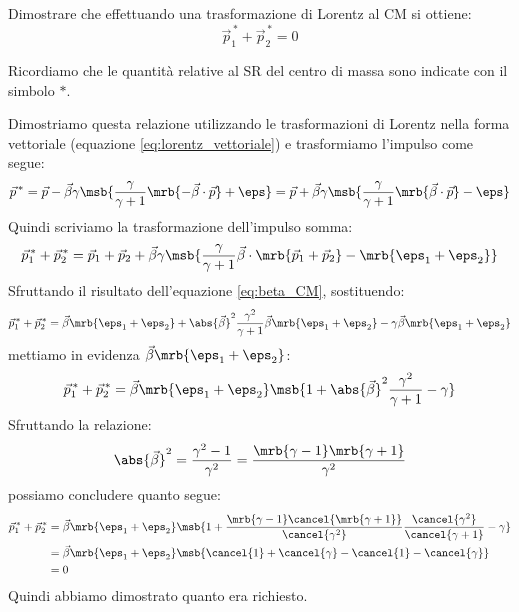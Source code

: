 \begin{example}[]
	Dimostrare che effettuando una trasformazione di Lorentz al CM si ottiene:
	\begin{equation}
		\vec{p}_1^{\,\ast} + \vec{p}_2^{\,\ast} = 0
	\end{equation}

	\begin{note}[]
		Ricordiamo che le quantità relative al SR del centro di massa sono indicate
		con il simbolo $\ast$.
	\end{note}

	Dimostriamo questa relazione utilizzando le trasformazioni di Lorentz nella
	forma vettoriale (equazione \ref{eq:lorentz_vettoriale}) e trasformiamo
	l'impulso come segue:
	\begin{equation}
		\vec{p}^{\,\ast} = \vec{p} - \vec{\beta}\gamma \msb{\frac{\gamma}{\gamma +
				1} \mrb{ -\vec{\beta} \cdot \vec{p}} + \eps} = \vec{p} + \vec{\beta}\gamma
		\msb{\frac{\gamma}{\gamma + 1} \mrb{\vec{\beta} \cdot \vec{p}} - \eps}
	\end{equation}
	Quindi scriviamo la trasformazione dell'impulso somma:
	\begin{equation}
		\vec{p}_1^{\,\ast} + \vec{p}_2^{\,\ast} = \vec{p}_1 + \vec{p}_2 +
		\vec{\beta}\gamma \msb{\frac{\gamma}{\gamma+1} \vec{\beta} \cdot
			\mrb{\vec{p}_1 + \vec{p}_2} - \mrb{\eps_1 + \eps_2}}
	\end{equation}
	Sfruttando il risultato dell'equazione \ref{eq:beta_CM}, sostituendo:
	\begin{equation}
		\vec{p}_1^{\,\ast} + \vec{p}_2^{\,\ast} = \vec{\beta} \mrb{\eps_1 +
			\eps_2} + \abs{\vec{\beta}}^2 \frac{\gamma^2}{\gamma + 1}
    \vec{\beta}\mrb{\eps_1 + \eps_2} - \gamma\vec{\beta} \mrb{\eps_1 + \eps_2}
	\end{equation}
	mettiamo in evidenza $\vec{\beta}\mrb{\eps_1 + \eps_2}$:
	\begin{equation}
		\vec{p}_1^{\,\ast} + \vec{p}_2^{\,\ast} = \vec{\beta}\mrb{\eps_1 +
			\eps_2} \msb{1 + \abs{\vec{\beta}}^2 \frac{\gamma^2}{\gamma + 1} -
			\gamma}
	\end{equation}
	Sfruttando la relazione:
	\begin{equation}
		\abs{\vec{\beta}}^2 = \frac{\gamma^2 - 1}{\gamma^2} = \frac{\mrb{\gamma -
				1} \mrb{\gamma + 1}}{\gamma^2}
	\end{equation}
	possiamo concludere quanto segue:
	\begin{align}
		\vec{p}_1^{\,\ast} + \vec{p}_2^{\,\ast}
		 & = \vec{\beta}\mrb{\eps_1 + \eps_2} \msb{1 + \frac{\mrb{\gamma - 1}
				\cancel{\mrb{\gamma + 1}}}{\cancel{\gamma^2}}
			\frac{\cancel{\gamma^2}}{\cancel{\gamma + 1}} - \gamma}
		\\\notag
		 & = \vec{\beta}\mrb{\eps_1 + \eps_2} \msb{\cancel{1} + \cancel{\gamma} -
			\cancel{1} - \cancel{\gamma}}
		\\\notag
		 & = 0
	\end{align}
	Quindi abbiamo dimostrato quanto era richiesto.
\end{example}

